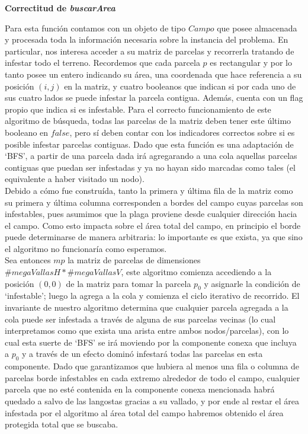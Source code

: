 \textbf{Correctitud de \textit{buscarArea} }

\indent Para esta función contamos con un objeto de tipo $Campo$ que posee almacenada y procesada toda la información necesaria sobre la instancia del problema. En particular, nos interesa acceder a su matriz de parcelas y recorrerla tratando de infestar todo el terreno. Recordemos que cada parcela $p$ es rectangular y por lo tanto posee un entero indicando su área, una coordenada que hace referencia a su posición $(i,j)$ en la matriz, y cuatro booleanos que indican si por cada uno de sus cuatro lados se puede infestar la parcela contigua. Además, cuenta con un flag propio que indica si es infestable. Para el correcto funcionamiento de este algoritmo de búsqueda, todas las parcelas de la matriz deben tener este último booleano en $false$, pero sí deben contar con los indicadores correctos sobre si es posible infestar parcelas contiguas. Dado que esta función es una adaptación de `BFS', a partir de una parcela dada irá agregarando a una cola aquellas parcelas contiguas que puedan ser infestadas y ya no hayan sido marcadas como tales (el equivalente a haber visitado un nodo).\\
\indent Debido a cómo fue construída, tanto la primera y última fila de la matriz como su primera y última columna corresponden a bordes del campo cuyas parcelas son infestables, pues asumimos que la plaga proviene desde cualquier dirección hacia el campo. Como esto impacta sobre el área total del campo, en principio el borde puede determinarse de manera arbitraria: lo importante es que exista, ya que sino el algoritmo no funcionaría como esperamos.\\
\indent Sea entonces $mp$ la matriz de parcelas de dimensiones $\#megaVallasH*\#megaVallasV$, este algoritmo comienza accediendo a la posición $(0,0)$ de la matriz para tomar la parcela $p_{0}$ y asignarle la condición de `infestable'; luego la agrega a la cola y comienza el ciclo iterativo de recorrido. El invariante de nuestro algoritmo determina que cualquier parcela agregada a la cola puede ser infestada a través de alguna de sus parcelas vecinas (lo cual interpretamos como que exista una arista entre ambos nodos/parcelas), con lo cual esta suerte de `BFS' se irá moviendo por la componente conexa que incluya a $p_{0}$ y a través de un efecto dominó infestará todas las parcelas en esta componente. Dado que garantizamos que hubiera al menos una fila o columna de parcelas borde infestables en cada extremo alrededor de todo el campo, cualquier parcela que no esté contenida en la componente conexa mencionada habrá quedado a salvo de las langostas gracias a su vallado, y por ende al restar el área infestada por el algoritmo al área total del campo habremos obtenido el área protegida total que se buscaba.\\
